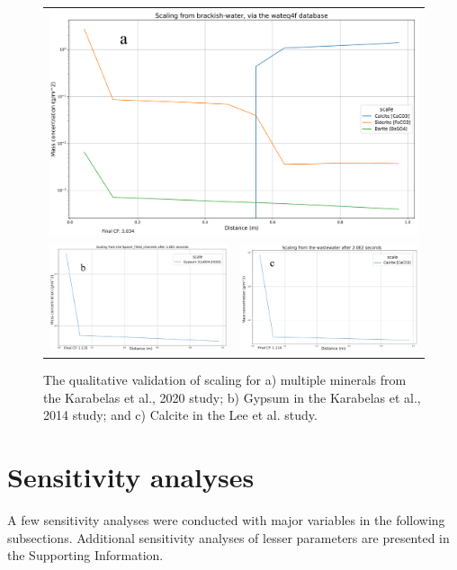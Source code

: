 \begin{figure}
    \begin{tabular}{c|c}
        \multicolumn{2}{c}{\includegraphics[width=\linewidth]{images/ROSSpy/case_studies/Karabelas_2020_wateq4f.png}} \\
        \includegraphics[width=0.49\linewidth]{images/ROSSpy/case_studies/Karabelas_2014_pitzer.png} 
        & \includegraphics[width=0.49\linewidth]{images/ROSSpy/case_studies/Lee_pitzer.png} \\
    \end{tabular}
    \caption{
        The qualitative validation of scaling for a) multiple minerals from the Karabelas et al., 2020 study; b) Gypsum in the Karabelas et al., 2014 study; and c) Calcite in the Lee et al. study. 
    }
    \label{qualitative_scaling}
\end{figure}


\section{Sensitivity analyses}
A few sensitivity analyses were conducted with major variables in the following subsections. Additional sensitivity analyses of lesser parameters are presented in the Supporting Information.

